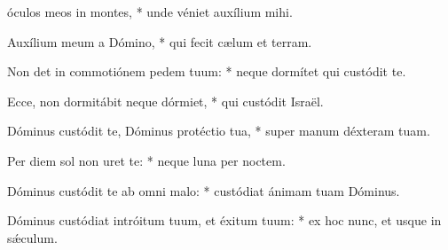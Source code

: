 \begin{psalmus}

 óculos meos in montes, * unde véniet auxílium mihi.

Auxílium meum a Dómino, * qui fecit cælum et terram.

Non det in commotiónem pedem tuum: * neque dormítet qui custódit te.

Ecce, non dormitábit neque dórmiet, * qui custódit Israël.

Dóminus custódit te, Dóminus protéctio tua, * super manum déxteram tuam.

Per diem sol non uret te: * neque luna per noctem.

Dóminus custódit te ab omni malo: * custódiat ánimam tuam Dóminus.

Dóminus custódiat intróitum tuum, et éxitum tuum: * ex hoc nunc, et usque in sǽculum.

\end{psalmus}
